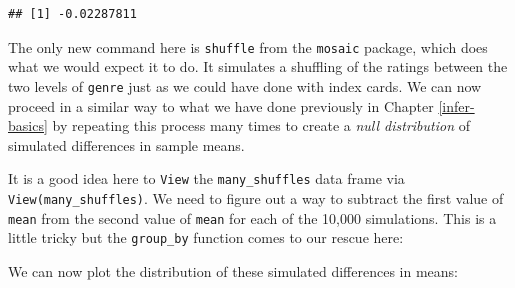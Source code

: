 \documentclass[]{tufte-book}
\newenvironment{Shaded}{\begin{snugshade}}{\end{snugshade}}
\newcommand{\KeywordTok}[1]{\textcolor[rgb]{0.13,0.29,0.53}{\textbf{{#1}}}}
\newcommand{\DataTypeTok}[1]{\textcolor[rgb]{0.13,0.29,0.53}{{#1}}}
\newcommand{\DecValTok}[1]{\textcolor[rgb]{0.00,0.00,0.81}{{#1}}}
\newcommand{\StringTok}[1]{\textcolor[rgb]{0.31,0.60,0.02}{{#1}}}
\newcommand{\NormalTok}[1]{{#1}}
\begin{document}
\begin{verbatim}
## [1] -0.02287811
\end{verbatim}

The only new command here is \texttt{shuffle} from the \texttt{mosaic}
package, which does what we would expect it to do. It simulates a
shuffling of the ratings between the two levels of \texttt{genre} just
as we could have done with index cards. We can now proceed in a similar
way to what we have done previously in Chapter \ref{infer-basics} by
repeating this process many times to create a \emph{null distribution}
of simulated differences in sample means.

\begin{Shaded}
\end{Shaded}

It is a good idea here to \texttt{View} the \texttt{many\_shuffles} data
frame via \texttt{View(many\_shuffles)}. We need to figure out a way to
subtract the first value of \texttt{mean} from the second value of
\texttt{mean} for each of the 10,000 simulations. This is a little
tricky but the \texttt{group\_by} function comes to our rescue here:

\begin{Shaded}
\end{Shaded}

We can now plot the distribution of these simulated differences in
means:

\begin{Shaded}
\end{Shaded}
\end{document}
